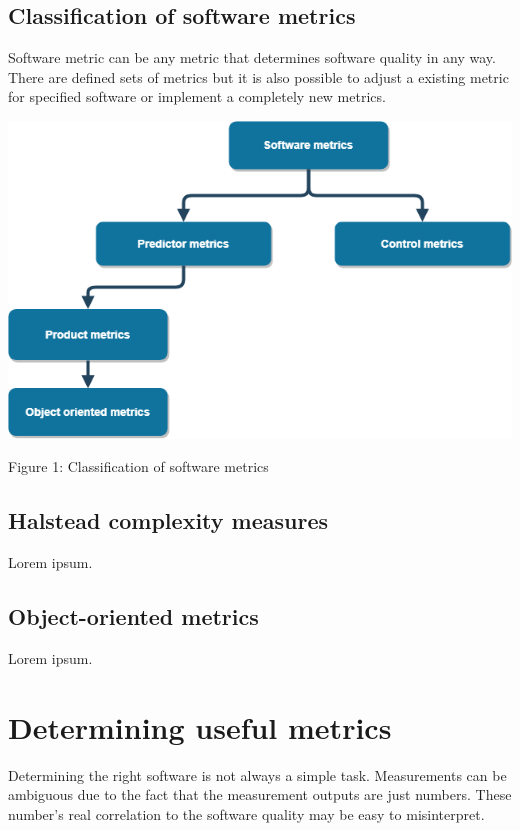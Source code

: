 \section{Classification of software metrics}

Software metric can be any metric that determines software quality in any way. There are defined sets of metrics but it is also possible to adjust a existing metric for specified software or implement a completely new metrics.

\begin{center}
\includegraphics[scale=0.5]{metrictree.png}

Figure 1: Classification of software metrics
\end{center}

\section{Halstead complexity measures}

Lorem ipsum.

\section{Object-oriented metrics}

Lorem ipsum.



\chapter{Determining useful metrics}

Determining the right software is not always a simple task. Measurements can be ambiguous due to the fact that the measurement outputs are just numbers. These number's real correlation to the software quality may be easy to misinterpret.

